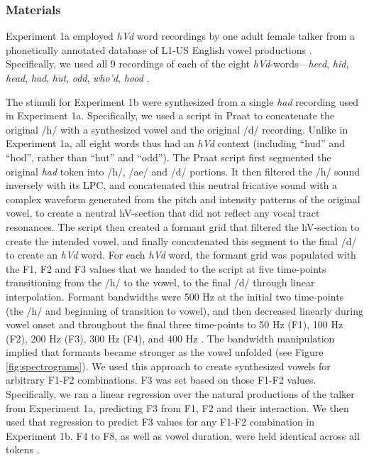 \documentclass[preprint]{JASA}
\begin{document}
\subsubsection{Materials}\label{sec:stimuli}

Experiment 1a employed \emph{hVd} word recordings by one adult female talker from a phonetically annotated database of L1-US English vowel productions \citep{xie-jaeger2020}. Specifically, we used all 9 recordings of each of the eight \emph{hVd}-words---\emph{heed}, \emph{hid}, \emph{head}, \emph{had}, \emph{hut}, \emph{odd}, \emph{who'd}, \emph{hood} \citetext{\citealp[the use of ``hut'' and ``odd'' rather than ``hud'' and ``hod'' follows][]{assmann2008}; \citealp[but see][]{hillenbrand1995}}.

The stimuli for Experiment 1b were synthesized from a single \emph{had} recording used in Experiment 1a. Specifically, we used a script \citep[based on descriptions in][]{wade2007} in Praat \citep{boersma-weenink2022} to concatenate the original /h/ with a synthesized vowel and the original /d/ recording. Unlike in Experiment 1a, all eight words thus had an \emph{hVd} context (including ``hud'' and ``hod'', rather than ``hut'' and ``odd''). The Praat script first segmented the original \emph{had} token into /h/, /ae/ and /d/ portions. It then filtered the /h/ sound inversely with its LPC, and concatenated this neutral fricative sound with a complex waveform generated from the pitch and intensity patterns of the original vowel, to create a neutral hV-section that did not reflect any vocal tract resonances. The script then created a formant grid that filtered the hV-section to create the intended vowel, and finally concatenated this segment to the final /d/ to create an \emph{hVd} word. For each \emph{hVd} word, the formant grid was populated with the F1, F2 and F3 values that we handed to the script at five time-points transitioning from the /h/ to the vowel, to the final /d/ through linear interpolation. Formant bandwidths were 500 Hz at the initial two time-points (the /h/ and beginning of transition to vowel), and then decreased linearly during vowel onset and throughout the final three time-points to 50 Hz (F1), 100 Hz (F2), 200 Hz (F3), 300 Hz (F4), and 400 Hz \citep[F5-F8, following][]{wade2007}. The bandwidth manipulation implied that formants became stronger as the vowel unfolded (see Figure \ref{fig:spectrograms}). We used this approach to create synthesized vowels for arbitrary F1-F2 combinations. F3 was set based on those F1-F2 values. Specifically, we ran a linear regression over the natural productions of the talker from Experiment 1a, predicting F3 from F1, F2 and their interaction. We then used that regression to predict F3 values for any F1-F2 combination in Experiment 1b. F4 to F8, as well as vowel duration, were held identical across all tokens \citep[using the same values as][]{wade2007}.
\end{document}
